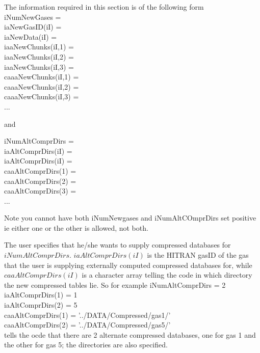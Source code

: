 \documentclass[12pt]{article}
\newcommand{\ttab}{\indent\indent}
\begin{document}
{{The information required in this section is of the following form\\
\medskip
{\sf 
\ttab iNumNewGases   = \\
\ttab iaNewGasID(iI)  = \\
\ttab iaNewData(iI)   = \\ 
\ttab \ttab   iaaNewChunks(iI,1)    =  \\
\ttab \ttab   iaaNewChunks(iI,2)    =  \\
\ttab \ttab   iaaNewChunks(iI,3)    =  \\
\ttab \ttab   caaaNewChunks(iI,1)    =  \\
\ttab \ttab   caaaNewChunks(iI,2)    =  \\
\ttab \ttab   caaaNewChunks(iI,3)    =  \\
\ttab ...\\
\ttab }

and 

{\sf 
\ttab iNumAltComprDirs   = \\
\ttab iaAltComprDirs(iI)  = \\
\ttab iaAltComprDirs(iI)   = \\ 
\ttab \ttab   caaAltComprDirs(1)    =  \\
\ttab \ttab   caaAltComprDirs(2)    =  \\
\ttab \ttab   caaAltComprDirs(3)    =  \\
\ttab ...\\
\ttab }

Note you cannot have both iNumNewgases and iNumAltCOmprDirs set positive ie 
either one or the other is allowed, not both.

The user specifies that he/she wants to supply compressed databases
for $iNumAltComprDirs$.  $iaAltComprDirs(iI)$ is the HITRAN gasID of
the gas that the user is supplying externally computed compressed
databases for, while $caaAltComprDirs(iI)$ is a character array
telling the code in which directory the new compressed tables lie. So
for example 
\newline
\medskip
\ttab  iNumAltComprDirs   =             2 \\
\ttab  iaAltComprDirs(1)  =             1\\
\ttab  iaAltComprDirs(2)   =            5\\
\ttab  \ttab      caaAltComprDirs(1)     =   '../DATA/Compressed/gas1/'\\
\ttab  \ttab      caaAltComprDirs(2)     =   '../DATA/Compressed/gas5/'\\
tells the ocde that there are 2 alternate compressed databases, one
for gas 1 and the other for gas 5; the directories are also specified.

}}
\end{document}
